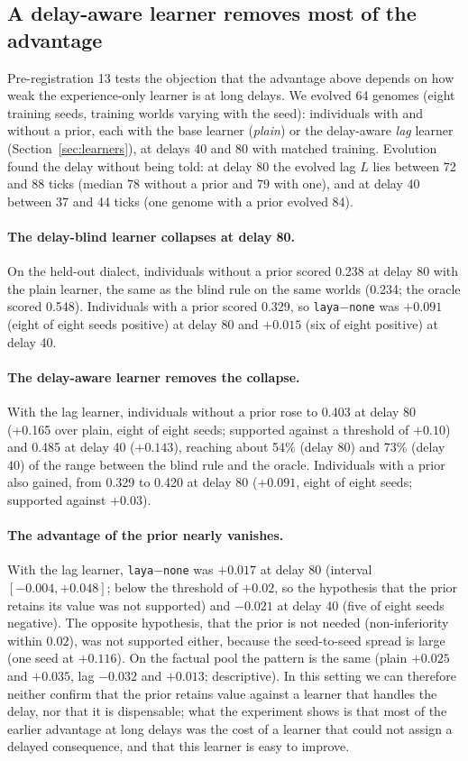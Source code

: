 \subsection{A delay-aware learner removes most of the advantage}
\label{sec:res-strong}
Pre-registration 13 tests the objection that the advantage above depends on how weak the experience-only learner is at long delays. We evolved 64 genomes (eight training seeds, training worlds varying with the seed): individuals with and without a prior, each with the base learner (\emph{plain}) or the delay-aware \emph{lag} learner (Section~\ref{sec:learners}), at delays 40 and 80 with matched training. Evolution found the delay without being told: at delay 80 the evolved lag $L$ lies between 72 and 88 ticks (median 78 without a prior and 79 with one), and at delay 40 between 37 and 44 ticks (one genome with a prior evolved 84).

\paragraph{The delay-blind learner collapses at delay 80.}
On the held-out dialect, individuals without a prior scored 0.238 at delay 80 with the plain learner, the same as the blind rule on the same worlds (0.234; the oracle scored 0.548). Individuals with a prior scored 0.329, so \texttt{laya}$-$\texttt{none} was $+0.091$ (eight of eight seeds positive) at delay 80 and $+0.015$ (six of eight positive) at delay 40.

\paragraph{The delay-aware learner removes the collapse.}
With the lag learner, individuals without a prior rose to 0.403 at delay 80 (+0.165 over plain, eight of eight seeds; supported against a threshold of $+0.10$) and 0.485 at delay 40 ($+0.143$), reaching about 54\% (delay 80) and 73\% (delay 40) of the range between the blind rule and the oracle. Individuals with a prior also gained, from 0.329 to 0.420 at delay 80 ($+0.091$, eight of eight seeds; supported against $+0.03$).

\paragraph{The advantage of the prior nearly vanishes.}
With the lag learner, \texttt{laya}$-$\texttt{none} was $+0.017$ at delay 80 (interval $[-0.004,+0.048]$; below the threshold of $+0.02$, so the hypothesis that the prior retains its value was not supported) and $-0.021$ at delay 40 (five of eight seeds negative). The opposite hypothesis, that the prior is not needed (non-inferiority within $0.02$), was not supported either, because the seed-to-seed spread is large (one seed at $+0.116$). On the factual pool the pattern is the same (plain $+0.025$ and $+0.035$, lag $-0.032$ and $+0.013$; descriptive). In this setting we can therefore neither confirm that the prior retains value against a learner that handles the delay, nor that it is dispensable; what the experiment shows is that most of the earlier advantage at long delays was the cost of a learner that could not assign a delayed consequence, and that this learner is easy to improve.

